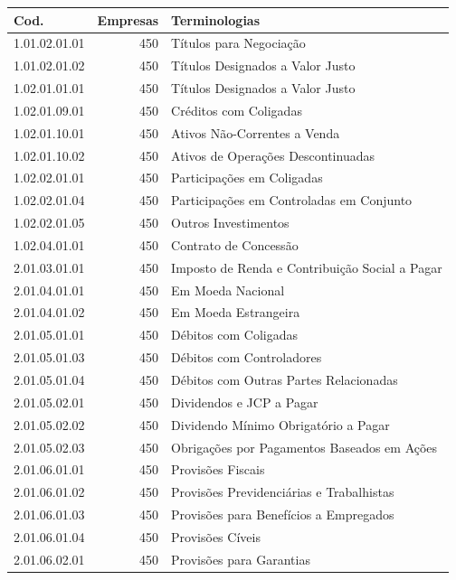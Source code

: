 \begin{table}[ht]
\centering
\begin{tabular}{lrl}
  \hline
Cod. & Empresas & Terminologias \\ 
  \hline
1.01.02.01.01 & 450 & Títulos para Negociação \\ 
  1.01.02.01.02 & 450 & Títulos Designados a Valor Justo \\ 
  1.02.01.01.01 & 450 & Títulos Designados a Valor Justo \\ 
  1.02.01.09.01 & 450 & Créditos com Coligadas \\ 
  1.02.01.10.01 & 450 & Ativos Não-Correntes a Venda \\ 
  1.02.01.10.02 & 450 & Ativos de Operações Descontinuadas \\ 
  1.02.02.01.01 & 450 & Participações em Coligadas \\ 
  1.02.02.01.04 & 450 & Participações em Controladas em Conjunto \\ 
  1.02.02.01.05 & 450 & Outros Investimentos \\ 
  1.02.04.01.01 & 450 & Contrato de Concessão \\ 
  2.01.03.01.01 & 450 & Imposto de Renda e Contribuição Social a Pagar \\ 
  2.01.04.01.01 & 450 & Em Moeda Nacional \\ 
  2.01.04.01.02 & 450 & Em Moeda Estrangeira \\ 
  2.01.05.01.01 & 450 & Débitos com Coligadas \\ 
  2.01.05.01.03 & 450 & Débitos com Controladores \\ 
  2.01.05.01.04 & 450 & Débitos com Outras Partes Relacionadas \\ 
  2.01.05.02.01 & 450 & Dividendos e JCP a Pagar \\ 
  2.01.05.02.02 & 450 & Dividendo Mínimo Obrigatório a Pagar \\ 
  2.01.05.02.03 & 450 & Obrigações por Pagamentos Baseados em Ações \\ 
  2.01.06.01.01 & 450 & Provisões Fiscais \\ 
  2.01.06.01.02 & 450 & Provisões Previdenciárias e Trabalhistas \\ 
  2.01.06.01.03 & 450 & Provisões para Benefícios a Empregados \\ 
  2.01.06.01.04 & 450 & Provisões Cíveis \\ 
  2.01.06.02.01 & 450 & Provisões para Garantias \\ 

\end{tabular}
\end{table}
